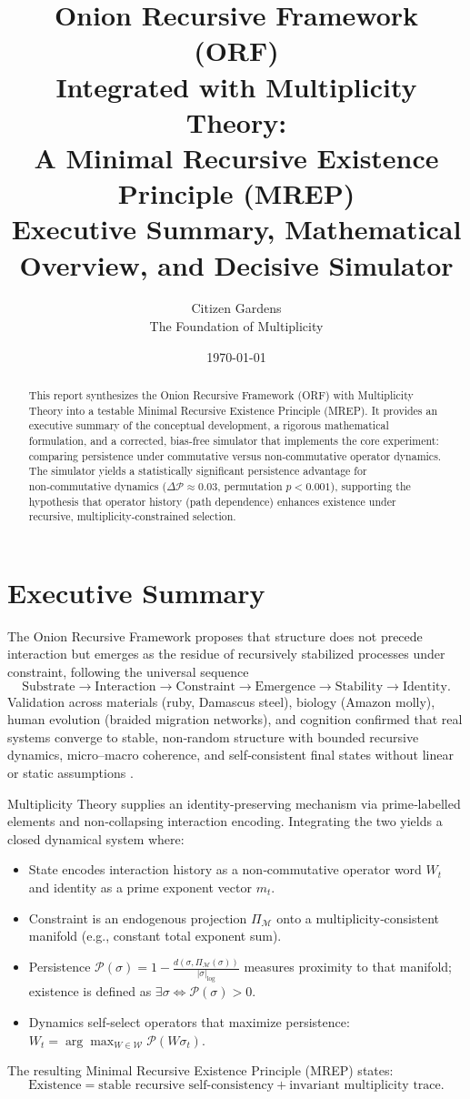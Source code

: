 \documentclass[11pt]{article}
\title{Onion Recursive Framework (ORF) \\ Integrated with Multiplicity Theory:\\ A Minimal Recursive Existence Principle (MREP) \\
\large Executive Summary, Mathematical Overview, and Decisive Simulator}
\author{Citizen Gardens \\ The Foundation of Multiplicity}
\date{\today}
\begin{document}
\maketitle

\begin{abstract}
This report synthesizes the Onion Recursive Framework (ORF) with Multiplicity Theory into a testable Minimal Recursive Existence Principle (MREP).  It provides an executive summary of the conceptual development, a rigorous mathematical formulation, and a corrected, bias‑free simulator that implements the core experiment: comparing persistence under commutative versus non‑commutative operator dynamics.  The simulator yields a statistically significant persistence advantage for non‑commutative dynamics ($\Delta\mathcal{P}\approx0.03$, permutation $p<0.001$), supporting the hypothesis that operator history (path dependence) enhances existence under recursive, multiplicity‑constrained selection.
\end{abstract}

\section*{Executive Summary}
\label{sec:exec}
The Onion Recursive Framework proposes that structure does not precede interaction but emerges as the residue of recursively stabilized processes under constraint, following the universal sequence  
\[
\text{Substrate}\rightarrow\text{Interaction}\rightarrow\text{Constraint}\rightarrow\text{Emergence}\rightarrow\text{Stability}\rightarrow\text{Identity}.
\]  
Validation across materials (ruby, Damascus steel), biology (Amazon molly), human evolution (braided migration networks), and cognition confirmed that real systems converge to stable, non‑random structure with bounded recursive dynamics, micro–macro coherence, and self‑consistent final states without linear or static assumptions \citep{web:1}.  

Multiplicity Theory supplies an identity‑preserving mechanism via prime‑labelled elements and non‑collapsing interaction encoding.  Integrating the two yields a closed dynamical system where:
\begin{itemize}
\item State encodes interaction history as a non‑commutative operator word $W_t$ and identity as a prime exponent vector $m_t$.
\item Constraint is an endogenous projection $\Pi_{\mathcal{M}}$ onto a multiplicity‑consistent manifold (e.g., constant total exponent sum).
\item Persistence $\mathcal{P}(\sigma)=1-\frac{d(\sigma,\Pi_{\mathcal{M}}(\sigma))}{|\sigma|_{\log}}$ measures proximity to that manifold; existence is defined as $\exists\sigma\iff\mathcal{P}(\sigma)>0$.
\item Dynamics self‑select operators that maximize persistence: $W_t=\arg\max_{W\in\mathcal{W}}\mathcal{P}(W\sigma_t)$.
\end{itemize}
The resulting Minimal Recursive Existence Principle (MREP) states:
\[
\boxed{\text{Existence} = \text{stable recursive self‑consistency} + \text{invariant multiplicity trace}.}
\]
\end{document}
